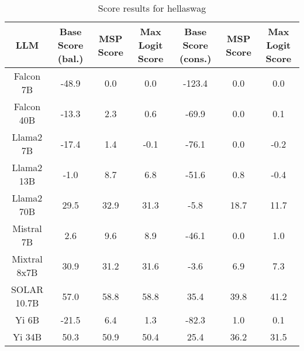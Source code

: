\renewcommand\arraystretch{1.2}
\begin{table*}
\centering
\begin{tabular}{c|c|c|c|c|c|c}
LLM & Base Score (bal.) & MSP Score & Max Logit Score & Base Score (cons.) & MSP Score & Max Logit Score\\ \hline
Falcon 7B & -48.9 & 0.0 & 0.0 & -123.4 & 0.0 & 0.0\\
Falcon 40B & -13.3 & 2.3 & 0.6 & -69.9 & 0.0 & 0.1\\
Llama2 7B & -17.4 & 1.4 & -0.1 & -76.1 & 0.0 & -0.2\\
Llama2 13B & -1.0 & 8.7 & 6.8 & -51.6 & 0.8 & -0.4\\
Llama2 70B & 29.5 & 32.9 & 31.3 & -5.8 & 18.7 & 11.7\\
Mistral 7B & 2.6 & 9.6 & 8.9 & -46.1 & 0.0 & 1.0\\
Mixtral 8x7B & 30.9 & 31.2 & 31.6 & -3.6 & 6.9 & 7.3\\
SOLAR 10.7B & 57.0 & 58.8 & 58.8 & 35.4 & 39.8 & 41.2\\
Yi 6B & -21.5 & 6.4 & 1.3 & -82.3 & 1.0 & 0.1\\
Yi 34B & 50.3 & 50.9 & 50.4 & 25.4 & 36.2 & 31.5\\
\hline
\end{tabular}
\caption{Score results for hellaswag}
\end{table*}
\label{tab:hellaswag_score}
